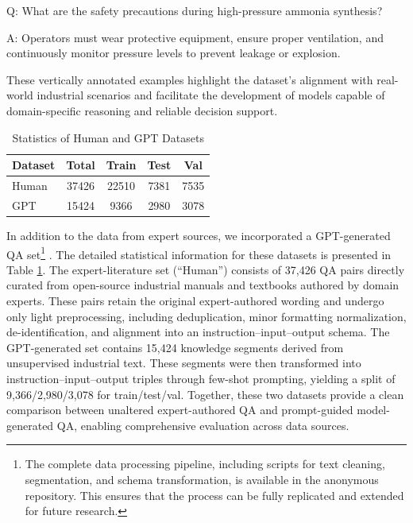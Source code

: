 \documentclass[preprint,12pt]{elsarticle}
\def\textbf#1{#1}%
\begin{document}
\begin{tcolorbox}[colback=gray!5!white,colframe=gray!40!black,title=\textbf{Example 2: Production Process → Safety Regulation}]
\textbf{Q:} What are the safety precautions during high-pressure ammonia synthesis?  

\textbf{A:} Operators must wear protective equipment, ensure proper ventilation, and continuously monitor pressure levels to prevent leakage or explosion.  
\end{tcolorbox}

These vertically annotated examples highlight the dataset’s alignment with real-world industrial scenarios and facilitate the development of models capable of domain-specific reasoning and reliable decision support.

\begin{table}[H]

\centering
\begin{tabular}{lcccc}
\toprule
Dataset & Total & Train & Test & Val \\
\midrule
Human & 37426 & 22510 & 7381 & 7535 \\
GPT & 15424 & 9366 & 2980 & 3078 \\
\bottomrule
\end{tabular}
\caption{Statistics of Human and GPT Datasets}
\label{tab:statistics}
\end{table}

In addition to the data from expert sources, we incorporated a \textbf{GPT-generated QA set}\footnote{The complete data processing pipeline, including scripts for text cleaning, segmentation, and schema transformation, is available in the anonymous repository. This ensures that the process can be fully replicated and extended for future research.}
. The detailed statistical information for these datasets is presented in Table \ref{tab:statistics}. The expert-literature set (“Human”) consists of 37,426 QA pairs directly curated from open-source industrial manuals and textbooks authored by domain experts. These pairs retain the original expert-authored wording and undergo only light preprocessing, including deduplication, minor formatting normalization, de-identification, and alignment into an instruction–input–output schema. The GPT-generated set contains 15,424 knowledge segments derived from unsupervised industrial text. These segments were then transformed into instruction–input–output triples through few-shot prompting, yielding a split of 9,366/2,980/3,078 for train/test/val. Together, these two datasets provide a clean comparison between unaltered expert-authored QA and prompt-guided model-generated QA, enabling comprehensive evaluation across data sources.
\end{document}
